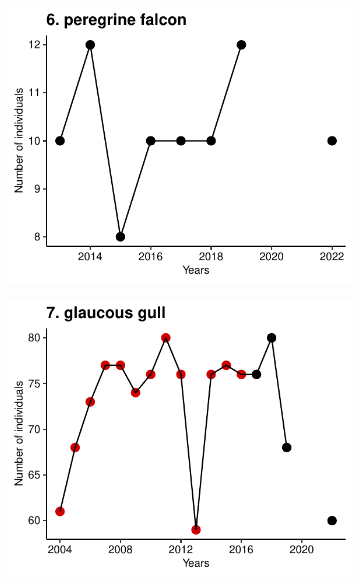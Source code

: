 \documentclass[a4paper,twoside,10pt]{article}
\begin{document}
\begin{figure}[ht]
\begin{subfigure}{0.45\textwidth}
\includegraphics[width=\linewidth]{figures/species_temporal_series/peregrine_falcon.pdf}
\end{subfigure}
\begin{subfigure}{0.45\textwidth}
\includegraphics[width=\linewidth]{figures/species_temporal_series/glaucous_gull.pdf}
\end{subfigure}
\hfill
\begin{subfigure}{0.45\textwidth}

\end{subfigure}
\end{figure}
\end{document}
